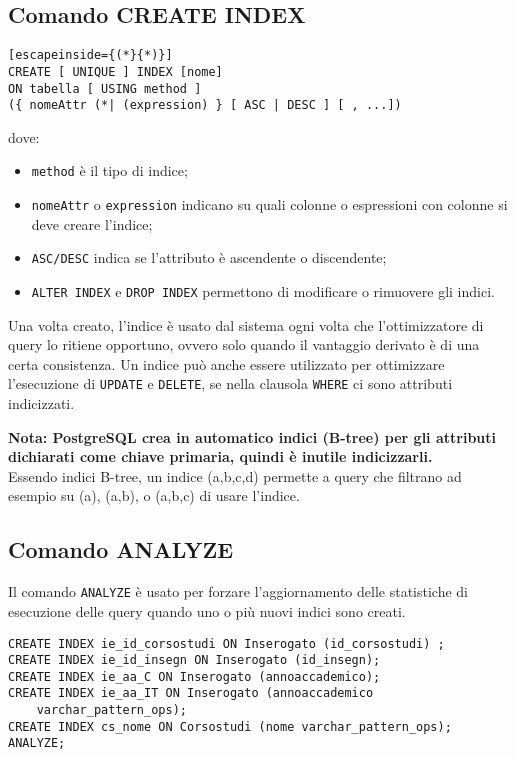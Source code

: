 \documentclass[a4paper, 10pt, titlepage]{article}
\begin{document}
	\subsection{Comando CREATE INDEX} \label{createindex}
	\begin{lstlisting}[escapeinside={(*}{*)}]
CREATE [ UNIQUE ] INDEX [nome]
ON tabella [ USING method ]
({ nomeAttr (*| (expression) } [ ASC | DESC ] [ , ...])
	\end{lstlisting}
	dove:
	\begin{itemize}
		\item \verb|method| è il tipo di indice;
		\item \verb|nomeAttr| o \verb|expression| indicano su quali colonne o espressioni con colonne si deve creare l'indice;
		\item \lstinline|ASC/DESC| indica se l'attributo è ascendente o discendente;
		\item \lstinline|ALTER INDEX| e \lstinline|DROP INDEX| permettono di modificare o rimuovere gli indici.
	\end{itemize}

	Una volta creato, l'indice è usato dal sistema ogni volta che l'ottimizzatore di query lo ritiene opportuno, ovvero solo quando il vantaggio derivato è di una certa consistenza. Un indice può anche essere utilizzato per ottimizzare l'esecuzione di \lstinline|UPDATE| e \lstinline|DELETE|, se nella clausola \lstinline|WHERE| ci sono attributi indicizzati.
	
	\noindent
	\textbf{Nota: PostgreSQL crea in automatico indici (B-tree) per gli attributi dichiarati come chiave primaria, quindi è inutile indicizzarli.}\\
	Essendo indici B-tree, un indice (a,b,c,d) permette a query che filtrano ad esempio su (a), (a,b), o (a,b,c) di usare l'indice.
	
	\subsection{Comando ANALYZE}
	Il comando \lstinline|ANALYZE| è usato per forzare l'aggiornamento delle statistiche di esecuzione delle query quando uno o più nuovi indici sono creati.
	\begin{lstlisting}
CREATE INDEX ie_id_corsostudi ON Inserogato (id_corsostudi) ;
CREATE INDEX ie_id_insegn ON Inserogato (id_insegn);
CREATE INDEX ie_aa_C ON Inserogato (annoaccademico);
CREATE INDEX ie_aa_IT ON Inserogato (annoaccademico
	varchar_pattern_ops);
CREATE INDEX cs_nome ON Corsostudi (nome varchar_pattern_ops);
ANALYZE;
	\end{lstlisting}
	
\end{document}
